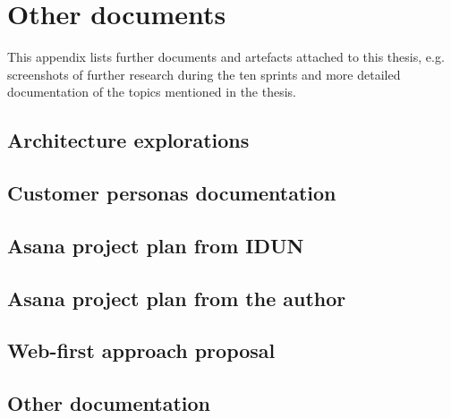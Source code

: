 \chapter{Other documents}
\label{appendix7-other-documents}

This appendix lists further documents and artefacts attached to this thesis, e.g. screenshots of further research during the ten sprints and more detailed documentation of the topics mentioned in the thesis.

\section*{Architecture explorations}

\section*{Customer personas documentation}

\section*{Asana project plan from IDUN}

\section*{Asana project plan from the author}

\section*{Web-first approach proposal}

\section*{Other documentation}
